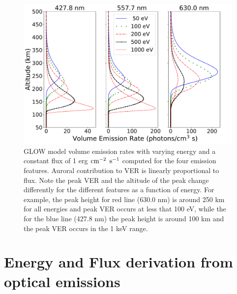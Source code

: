 \begin{figure}
	\centering\includegraphics[width=35pc]{ver_vs_e1.pdf}
	\caption{GLOW model volume emission rates with varying energy and a constant flux of 1 erg $\rm cm^{-2}$ $\rm s^{-1}$ computed for the four emission features. Auroral contribution to VER is linearly proportional to flux. Note the peak VER and the altitude of the peak change differently for the different features as a function of energy. For
		example, the peak height for red line (630.0 nm) is around 250 km for all energies and peak VER occurs at less that 100 eV, while the for the blue line (427.8 nm) the peak height is around 100 km and the peak VER occurs in the 1 keV range.}
	\label{fig:vve}
\end{figure}
\section{Energy and Flux derivation from optical emissions}
